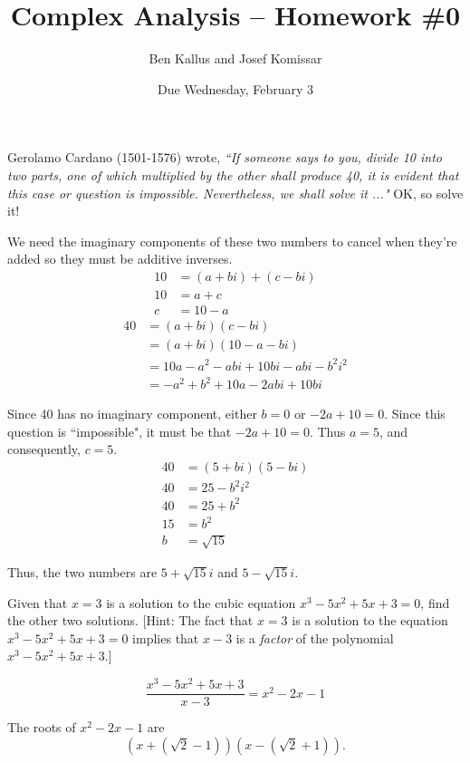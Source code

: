 \documentclass[11pt]{article}       %
\title{Complex Analysis -- Homework \#0}
\author{ Ben Kallus and Josef Komissar }
\date{ Due Wednesday, February 3 }
\theoremstyle{definition}
\begin{document}
\pagecolor{black}
\color{white}
\maketitle

  Gerolamo Cardano (1501-1576) wrote,
{\sl ``If someone says to you, divide 10 into two parts, one of which multiplied by the other shall produce 40, it is evident that this case or question is impossible. Nevertheless, we shall solve it ..."} \quad 
OK, so solve it!

    We need the imaginary components of these two numbers to cancel when they're added so they must be additive inverses.
    \begin{align*}
        10 &= (a+bi) + (c-bi) \\
        10 &= a + c \\
        c  &= 10 - a
    \end{align*}
    \begin{align*}
        40 &= (a+bi)(c-bi) \\
           &= (a+bi)(10-a-bi) \\
           &= 10a - a^2 - abi + 10bi - abi -b^2i^2 \\
           &= -a^2 + b^2 + 10a - 2abi + 10bi
    \end{align*}

    Since 40 has no imaginary component, either $b=0$ or $-2a+10=0$.
    Since this question is ``impossible", it must be that $-2a+10=0$.
    Thus $a=5$, and consequently, $c=5$.
    \begin{align*}
        40 &= (5+bi)(5-bi) \\
        40 &= 25 -b^2i^2 \\
        40 &= 25 + b^2 \\
        15 &= b^2 \\
        b  &= \sqrt{15}
    \end{align*}

    Thus, the two numbers are $5+\sqrt{15}i$ and $5-\sqrt{15}i$.

\newpage
{}  Given that $x=3$ is a solution to the cubic equation $x^3-5x^2+5x+3=0$, find the other two solutions. [{\sc Hint:} The fact that $x=3$ is a solution to the equation $x^3-5x^2+5x+3=0$ implies that $x-3$ is a \emph{factor} of the polynomial
$x^3-5x^2+5x+3$.]

    $$\frac{x^3-5x^2+5x+3}{x-3} = x^2-2x-1$$

    The roots of $x^2-2x-1$ are $$\left(x+\left(\sqrt{2}-1\right)\right)\left(x-\left(\sqrt{2}+1\right)\right).$$
\end{document}
